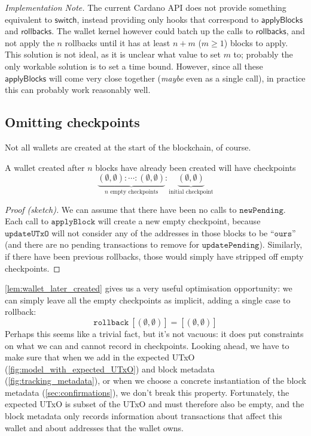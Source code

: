 \documentclass{article}
\theoremstyle{definition}{
  \newtheorem{lemma}{Lemma}[section] %
  \newtheorem{definition}[lemma]{Definition}
}
\theoremstyle{theorem}{
  \newtheorem{invariant}[lemma]{Invariant}
  \newtheorem{proofobligation}[lemma]{Proof Obligation}
}
\numberwithin{equation}{lemma}
\begin{document}
\emph{Implementation Note.} The current Cardano API does not provide something
equivalent to $\mathsf{switch}$, instead providing only hooks that correspond to
$\mathsf{applyBlocks}$ and $\mathsf{rollbacks}$. The wallet kernel however could
batch up the calls to $\mathsf{rollbacks}$, and not apply the $n$ rollbacks
until it has at least $n + m$ ($m \ge 1$) blocks to apply. This solution is not
ideal, as it is unclear what value to set $m$ to; probably the only workable
solution is to set a time bound. However, since all these $\mathsf{applyBlocks}$
will come very close together (\emph{maybe} even as a single call), in practice
this can probably work reasonably well.

\subsection{Omitting checkpoints}

Not all wallets are created at the start of the blockchain, of course.

\begin{lemma}
A wallet created after $n$ blocks have already been created will have checkpoints
%
\begin{equation*}
  \underbrace{ (\emptyset, \emptyset)
             : \cdots
             : (\emptyset, \emptyset)
             }_{\text{$n$ empty checkpoints}}
: \underbrace{ (\emptyset, \emptyset)
             }_{\text{initial checkpoint}}
\end{equation*}
\label{lem:wallet_later_created}
\end{lemma}

\begin{proof}[Proof (sketch)]
We can assume that there have been no calls to $\mathtt{newPending}$. Each call
to $\mathtt{applyBlock}$ will create a new empty checkpoint, because
$\mathtt{updateUTxO}$ will not consider any of the addresses in those blocks to
be ``$\mathtt{ours}$'' (and there are no pending transactions to remove for
$\mathtt{updatePending}$). Similarly, if there have been previous rollbacks,
those would simply have stripped off empty checkpoints.
\end{proof}

\cref{lem:wallet_later_created} gives us a very useful optimisation opportunity:
we can simply leave all the empty checkpoints as implicit, adding a single
case to rollback:
%
\begin{equation*}
\mathtt{rollback} ~ [(\emptyset, \emptyset)] = [(\emptyset, \emptyset)]
\end{equation*}
%
Perhaps this seems like a trivial fact, but it's not vacuous: it does put
constraints on what we can and cannot record in checkpoints. Looking ahead, we
have to make sure that when we add in the expected UTxO
(\cref{fig:model_with_expected_UTxO}) and block metadata
(\cref{fig:tracking_metadata}), or when we choose a concrete instantiation of
the block metadata (\cref{sec:confirmations}), we don't break this property.
Fortunately, the expected UTxO is subset of the UTxO and must therefore also be
empty, and the block metadata only records information about transactions that
affect this wallet and about addresses that the wallet owns.
\end{document}

